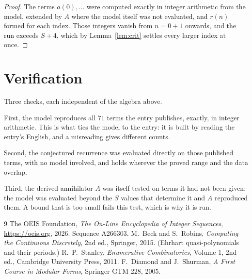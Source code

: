 \documentclass[11pt,a4paper]{article}
\theoremstyle{plain}
\theoremstyle{definition}
\begin{document}
\begin{proof}
The terms $a(0),\dots$ were computed exactly in integer arithmetic from the model, extended by
$A$ where the model itself was not evaluated, and $r(n)$ formed for each index. Those integers
vanish from $n=0+1$ onwards, and the run exceeds $S+4$, which by
Lemma~\ref{lem:crit} settles every larger index at once.
\end{proof}

\section{Verification}

Three checks, each independent of the algebra above.

First, the model reproduces all $71$ terms the entry publishes, exactly, in integer
arithmetic. This is what ties the model to the entry: it is built by reading the entry's
English, and a misreading gives different counts.

Second, the conjectured recurrence was evaluated directly on those published terms, with no
model involved, and holds wherever the proved range and the data overlap.

Third, the derived annihilator $A$ was itself tested on terms it had not been given: the model
was evaluated beyond the $S$ values that determine it and $A$ reproduced them. A bound that is
too small fails this test, which is why it is run.

\begin{thebibliography}{9}
 The OEIS Foundation, \emph{The On-Line Encyclopedia of Integer
Sequences}, \url{https://oeis.org}, 2026. Sequence A266303.
 M.~Beck and S.~Robins, \emph{Computing the Continuous Discretely},
2nd ed., Springer, 2015. (Ehrhart quasi-polynomials and their periods.)
 R.~P.~Stanley, \emph{Enumerative Combinatorics}, Volume 1, 2nd ed.,
Cambridge University Press, 2011.
 F.~Diamond and J.~Shurman, \emph{A First Course in Modular Forms},
Springer GTM 228, 2005.
\end{thebibliography}
\end{document}
